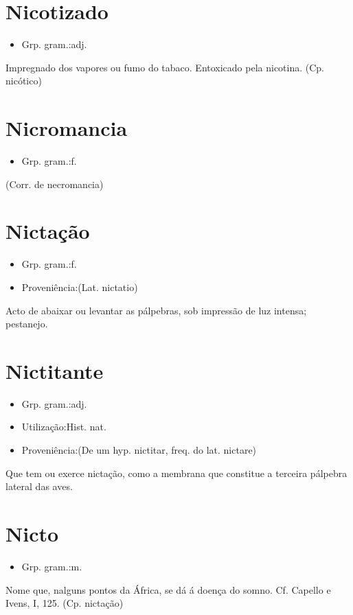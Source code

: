 \section{Nicotizado}
\begin{itemize}
\item {Grp. gram.:adj.}
\end{itemize}
Impregnado dos vapores ou fumo do tabaco.
Entoxicado pela nicotina.
(Cp. \textunderscore nicótico\textunderscore )
\section{Nicromancia}
\begin{itemize}
\item {Grp. gram.:f.}
\end{itemize}
(Corr. de \textunderscore necromancia\textunderscore )
\section{Nictação}
\begin{itemize}
\item {Grp. gram.:f.}
\end{itemize}
\begin{itemize}
\item {Proveniência:(Lat. \textunderscore nictatio\textunderscore )}
\end{itemize}
Acto de abaixar ou levantar as pálpebras, sob impressão de luz intensa; pestanejo.
\section{Nictitante}
\begin{itemize}
\item {Grp. gram.:adj.}
\end{itemize}
\begin{itemize}
\item {Utilização:Hist. nat.}
\end{itemize}
\begin{itemize}
\item {Proveniência:(De um hyp. \textunderscore nictitar\textunderscore , freq. do lat. \textunderscore nictare\textunderscore )}
\end{itemize}
Que tem ou exerce nictação, como a membrana que constitue a terceira pálpebra lateral das aves.
\section{Nicto}
\begin{itemize}
\item {Grp. gram.:m.}
\end{itemize}
Nome que, nalguns pontos da África, se dá á doença do somno. Cf. Capello e Ivens, I, 125.
(Cp. \textunderscore nictação\textunderscore )
